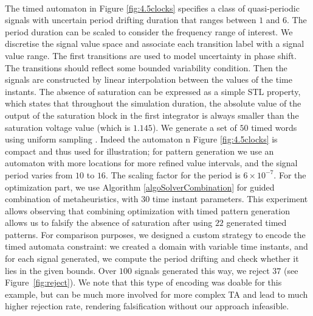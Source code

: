 ~\\
The timed automaton in Figure \ref{fig:4.5clocks} specifies a class of quasi-periodic signals with uncertain period drifting duration that ranges between $1$ and $6$. The period duration can be scaled to consider the frequency range of interest. We discretise the signal value space and associate each transition label with a signal value range. The first transitions are used to model uncertainty in phase shift. The transitions should reflect some bounded variability condition. Then the signals are constructed by linear interpolation between the values of the time instants. The absence of saturation can be expressed as a simple STL property, which states that throughout the simulation duration, the absolute value of the output of the saturation block in the first integrator is always smaller than the saturation voltage value (which is $1.145$). We generate a set of $50$ timed words using uniform sampling \cite{BBBK16}. Indeed the automaton n Figure \ref{fig:4.5clocks} is compact and thus used for illustration; for pattern generation we use an automaton with more locations for more refined value intervals, and the signal period varies from $10$ to $16$. The scaling factor for the period is $6 \times 10^{-7}$. For the optimization part, we use Algorithm \ref{algoSolverCombination} for guided  combination of metaheuristics, with $30$ time instant parameters. This experiment allows observing that combining optimization with timed pattern generation allows us to falsify the absence of saturation after using $22$ generated timed patterns. For comparison purposes, we designed a custom strategy to encode the timed automata constraint: we created a domain with variable time instants, and for each signal generated, we compute the period drifting and check whether it lies in the given bounds. Over $100$ signals generated this way, we reject $37$ (see Figure~\ref{fig:reject}). We note that this type of encoding was doable for this example, but can be much more involved for more complex TA and lead to much higher rejection rate, rendering falsification without our approach infeasible. 
